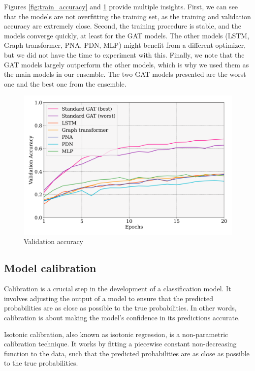 \documentclass[switch, 11pt]{article}
\begin{document}
\begin{multicols}{2}
    Figures \ref{fig:train_accuracy} and \ref{fig:val_accuracy} provide multiple insights. First, we can see that the models are not overfitting the training set, as the training and validation accuracy are extremely close. Second, the training procedure is stable, and the models converge quickly, at least for the GAT models. The other models (LSTM, Graph transformer, PNA, PDN, MLP) might benefit from a different optimizer, but we did not have the time to experiment with this. Finally, we note that the GAT models largely outperform the other models, which is why we used them as the main models in our ensemble. The two GAT models presented are the worst one and the best one from the ensemble.

    \begin{figure}[H]
        \centering
        \includegraphics[width=\columnwidth]{figures/val_accuracy.png}
        \caption{Validation accuracy}
        \label{fig:val_accuracy}
    \end{figure}

    \subsection{Model calibration}

    Calibration is a crucial step in the development of a classification model. It involves adjusting the output of a model to ensure that the predicted probabilities are as close as possible to the true probabilities. In other words, calibration is about making the model's confidence in its predictions accurate.

    Isotonic calibration, also known as isotonic regression, is a non-parametric calibration technique. It works by fitting a piecewise constant non-decreasing function to the data, such that the predicted probabilities are as close as possible to the true probabilities.


\end{multicols}
\end{document}
